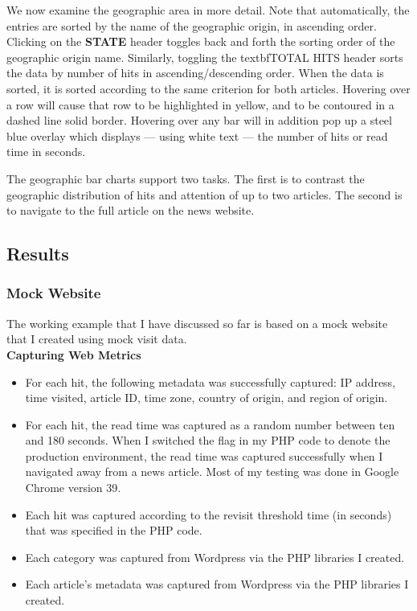 \documentclass[12pt]{article}
\begin{document}
{\noindent We now examine the geographic area in more detail. Note that automatically, the entries are sorted by the name of the geographic origin, in ascending order. Clicking on the \textbf{STATE} header toggles back and forth the sorting order of the geographic origin name. Similarly, toggling the textbf{TOTAL HITS} header sorts the data by number of hits in ascending/descending order. When the data is sorted, it is sorted according to the same criterion for both articles. Hovering over a row will cause that row to be highlighted in yellow, and to be contoured in a dashed line solid border. Hovering over any bar will in addition pop up a steel blue overlay which displays --- using white text --- the number of hits or read time in seconds.  

\noindent The geographic bar charts support two tasks. The first is to contrast the geographic distribution of hits and attention of up to two articles. The second is to navigate to the full article on the news website. 

\newpage

\subsection{Results}

\subsubsection{Mock Website}
The working example that I have discussed so far is based on a mock website that I created using mock visit data. \\

\noindent\textbf{Capturing Web Metrics}
\begin{itemize}
\item For each hit, the following metadata was successfully captured: IP address, time visited, article ID, time zone, country of origin, and region of origin.
\item For each hit, the read time was captured as a random number between ten and 180 seconds. When I switched the flag in my PHP code to denote the production environment, the read time was captured successfully when I navigated away from a news article. Most of my testing was done in Google Chrome version 39.
\item Each hit was captured according to the revisit threshold time (in seconds) that was specified in the PHP code.
\item Each category was captured from Wordpress via the PHP libraries I created.
\item Each article's metadata was captured from Wordpress via the PHP libraries I created.
\end{itemize}

}
\end{document}
